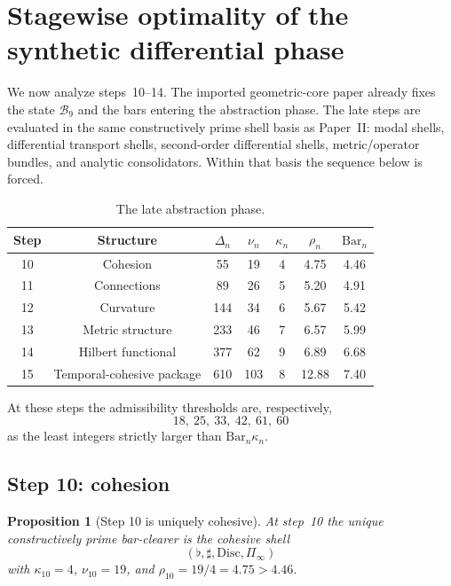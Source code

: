 \documentclass[11pt]{article}
\theoremstyle{plain}
\newtheorem{proposition}[theorem]{Proposition}
\theoremstyle{definition}
\theoremstyle{remark}
\newcommand{\B}{\mathcal{B}}
\newcommand{\Shape}{\Pi_{\!\infty}}
\newcommand{\Disc}{\mathrm{Disc}}
\newcommand{\SelBar}{\mathrm{Bar}}
\begin{document}
\section{Stagewise optimality of the synthetic differential phase}

We now analyze steps~10--14. The imported geometric-core paper already fixes the state $\B_9$ and the bars entering the abstraction phase. The late steps are evaluated in the same constructively prime shell basis as Paper~II: modal shells, differential transport shells, second-order differential shells, metric/operator bundles, and analytic consolidators. Within that basis the sequence below is forced.

\begin{table}[tbp]
\centering
\caption{The late abstraction phase.}
\label{tab:late-phase}
\small
\begin{tabular}{@{}ccccccc@{}}
\toprule
Step & Structure & $\Delta_n$ & $\nu_n$ & $\kappa_n$ & $\rho_n$ & $\SelBar_n$ \\
\midrule
10 & Cohesion & 55 & 19 & 4 & 4.75 & 4.46 \\
11 & Connections & 89 & 26 & 5 & 5.20 & 4.91 \\
12 & Curvature & 144 & 34 & 6 & 5.67 & 5.42 \\
13 & Metric structure & 233 & 46 & 7 & 6.57 & 5.99 \\
14 & Hilbert functional & 377 & 62 & 9 & 6.89 & 6.68 \\
15 & Temporal-cohesive package & 610 & 103 & 8 & 12.88 & 7.40 \\
\bottomrule
\end{tabular}
\end{table}

At these steps the admissibility thresholds are, respectively,
\[
  18,\ 25,\ 33,\ 42,\ 61,\ 60
\]
as the least integers strictly larger than $\SelBar_n\kappa_n$.

\subsection{Step 10: cohesion}

\begin{proposition}[Step 10 is uniquely cohesive]
\label{prop:step10}
At step~10 the unique constructively prime bar-clearer is the cohesive shell
\[
  (\flat,\sharp,\Disc,\Shape)
\]
with $\kappa_{10}=4$, $\nu_{10}=19$, and $\rho_{10}=19/4=4.75>4.46$.
\end{proposition}
\end{document}
